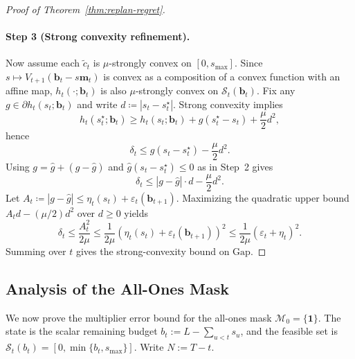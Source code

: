 \documentclass{uai2026} %
\newcommand{\1}{\mathbf{1}}
\newcommand{\scalt}{\mathcal{S}_{t}}
\renewcommand{\epsilon}{\varepsilon}
\newcommand{\mcal}{\mathcal{M}}
\begin{document}
\begin{proof}[Proof of Theorem~\ref{thm:replan-regret}]
  \paragraph{Step 3 (Strong convexity refinement).}
  Now assume each $\tilde{c}_t$ is $\mu$-strongly convex on $[0,s_{\max}]$.
  Since $s\mapsto V_{t+1}(\mathbf{b}_t-s\mathbf{m}_t)$ is convex as a composition of a convex function with an affine map, $h_t(\cdot;\mathbf{b}_t)$ is also $\mu$-strongly convex on $\scalt(\mathbf{b}_t)$.
  Fix any $g\in\partial h_t(s_t;\mathbf{b}_t)$ and write $d\coloneqq |s_t-s_t^{\star}|$.
  Strong convexity implies
  \begin{equation*}
    h_t(s_t^{\star};\mathbf{b}_t)
    \ge h_t(s_t;\mathbf{b}_t)+g(s_t^{\star}-s_t)+\frac{\mu}{2}d^2,
  \end{equation*}
  hence
  \begin{equation*}
    \delta_t
    \le g(s_t-s_t^{\star})-\frac{\mu}{2}d^2.
  \end{equation*}
  Using $g=\hat{g}+(g-\hat{g})$ and $\hat{g}(s_t-s_t^{\star})\le 0$ as in Step~2 gives
  \begin{equation*}
    \delta_t
    \le |g-\hat{g}|\cdot d-\frac{\mu}{2}d^2.
  \end{equation*}
  Let $A_t\coloneqq |g-\hat{g}|\le \eta_t(s_t)+\epsilon_t(\mathbf{b}_{t+1})$.
  Maximizing the quadratic upper bound $A_t d-(\mu/2)d^2$ over $d\ge 0$ yields
  \begin{equation*}
    \delta_t
    \le \frac{A_t^2}{2\mu}
    \le \frac{1}{2\mu}\left(\eta_t(s_t)+\epsilon_t(\mathbf{b}_{t+1})\right)^2
    \le \frac{1}{2\mu}(\epsilon_t+\eta_t)^2.
  \end{equation*}
  Summing over $t$ gives the strong-convexity bound on $\mathrm{Gap}$.
\end{proof}

\subsection{Analysis of the All-Ones Mask}
\label{app:dual-bounds}

We now prove the multiplier error bound for the all-ones mask $\mcal_{0}=\{\1\}$.
The state is the scalar remaining budget $b_t := L - \sum_{u<t} s_u$,
and the feasible set is $\scalt(b_t) = [0,\min\{b_t,s_{\max}\}]$.
Write $N := T-t$.
\end{document}
